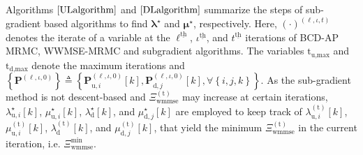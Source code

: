\documentclass[10pt,journal]{IEEEtran}
\newcommand{\paren}[1]{\left({#1}\right)}
\newcommand{\bracket}[1]{{\left [{#1}\right ]}}
\newcommand{\braces}[1]{{\left\{ {#1}\right\}}}
\newcommand{\ith}[1]    {{#1}^{\underline{\text{th}}}}
\theoremstyle{definition}
\begin{document}
Algorithms $\ref{ULalgorithm}$ and $\ref{DLalgorithm}$ summarize the steps of sub-gradient based algorithms to find $\boldsymbol{\lambda}^\star$ and $\boldsymbol{\mu}^\star$, respectively. Here, $(\cdot)^{\paren{\ell,\iota,t}}$ denotes the iterate of a variable at the $\ith{\ell}$, $\ith{\iota}$, and $\ith{t}$  iterations of BCD-AP MRMC, WWMSE-MRMC and subgradient algorithms. The variables $\mathrm{t}_{\textrm{u,max}}$ and $\mathrm{t}_{\textrm{d,max}}$ denote the maximum iterations and $\braces{\mathbf{P}^{\paren{\ell,\iota,0}}}\triangleq\braces{\mathbf{P}^{\paren{\ell,\iota,0}}_{\textrm{u},i}\bracket{k},\mathbf{P}^{\paren{\ell,\iota,0}}_{\textrm{d},j}\bracket{k},\forall \braces{i,j,k}}$. As the sub-gradient method is not descent-based and $\Xi^{\paren{\mathrm{t}}}_{\textrm{wmmse}}$ may increase at certain iterations\cite{Lui2006subg}, $\lambda^{\star}_{\textrm{u},i}\bracket{k}$, $\mu^\star_{\textrm{u},i}\bracket{k}$, $\lambda^{\star}_{\textrm{d}}\bracket{k}$, and $\mu^\star_{\textrm{d},j}\bracket{k}$ are employed to keep track of $\lambda^{\paren{\mathrm{t}}}_{\textrm{u},i}\bracket{k}$, $\mu^{\paren{\mathrm{t}}}_{\textrm{u},i}\bracket{k}$, $\lambda^{\paren{\mathrm{t}}}_{\textrm{d}}\bracket{k}$, and $\mu^{\paren{\mathrm{t}}}_{\textrm{d},j}\bracket{k}$,  that yield the minimum $\Xi^{\paren{\mathrm{t}}}_{\textrm{wmmse}}$ in the current iteration, i.e.  $\Xi^{\textrm{min}}_{\textrm{wmmse}}$.  
\end{document}
